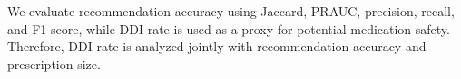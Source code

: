 \documentclass[manuscript,review]{acmart}
\begin{document}
We evaluate recommendation accuracy using Jaccard, PRAUC, precision, recall, and F1-score, while DDI rate is used as a proxy for potential medication safety. Therefore, DDI rate is analyzed jointly with recommendation accuracy and prescription size.





\end{document}
